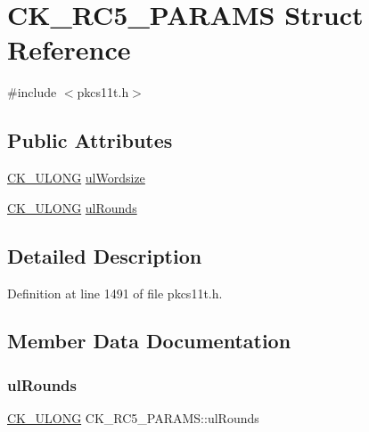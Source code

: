 \hypertarget{struct_c_k___r_c5___p_a_r_a_m_s}{}\section{C\+K\+\_\+\+R\+C5\+\_\+\+P\+A\+R\+A\+MS Struct Reference}
\label{struct_c_k___r_c5___p_a_r_a_m_s}


{\ttfamily \#include $<$pkcs11t.\+h$>$}

\subsection*{Public Attributes}
\begin{DoxyCompactItemize}
\item 
\hyperlink{pkcs11t_8h_a35181858a3b7a0a81f49d180d8f446ef}{C\+K\+\_\+\+U\+L\+O\+NG} \hyperlink{struct_c_k___r_c5___p_a_r_a_m_s_a3cd08884d3889efe696eeccbc2516aa5}{ul\+Wordsize}
\item 
\hyperlink{pkcs11t_8h_a35181858a3b7a0a81f49d180d8f446ef}{C\+K\+\_\+\+U\+L\+O\+NG} \hyperlink{struct_c_k___r_c5___p_a_r_a_m_s_a2b562353a63ec7727f7348957702de03}{ul\+Rounds}
\end{DoxyCompactItemize}


\subsection{Detailed Description}


Definition at line 1491 of file pkcs11t.\+h.



\subsection{Member Data Documentation}
\mbox{\label{struct_c_k___r_c5___p_a_r_a_m_s_a2b562353a63ec7727f7348957702de03}} 
\subsubsection{\texorpdfstring{ul\+Rounds}{ulRounds}}
{\footnotesize\ttfamily \hyperlink{pkcs11t_8h_a35181858a3b7a0a81f49d180d8f446ef}{C\+K\+\_\+\+U\+L\+O\+NG} C\+K\+\_\+\+R\+C5\+\_\+\+P\+A\+R\+A\+M\+S\+::ul\+Rounds}



